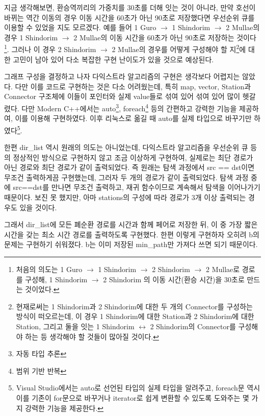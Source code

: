 \documentclass{article}
\begin{document}
지금 생각해보면, 환승역끼리의 가중치를 30초를 더해 잇는 것이 아니라, 만약 호선이 바뀌는 역간 이동의 경우 이동 시간을 60초가 아닌 90초로 저장했다면 우선순위 큐를 이용할 수 있었을 지도 모르겠다. 예를 들어 1 Guro $\rightarrow$ 1 Shindorim $\rightarrow$ 2 Mullae의 경우 1 Shindorim $\rightarrow$ 2 Mullae의 이동 시간을 60초가 아닌 90초로 저장하는 것이다\footnote{처음의 의도는 1 Guro $\rightarrow$ 1 Shindorim $\rightarrow$ 2 Shindorim $\rightarrow$ 2 Mullae로 경로를 구성해, 1 Shindorim $\rightarrow$ 2 Shindorim 의 이동 시간(환승 시간)을 30초로 만드는 것이었다.}. 그러나 이 경우 2 Shindorim $\rightarrow$ 2 Mullae의 경우를 어떻게 구성해야 할 지\footnote{현재로써는 1 Shindorim과 2 Shindorim에 대한 두 개의 Connector를 구성하는 방식이 떠오르는데, 이 경우 1 Shindorim에 대한 Station과 2 Shindorim에 대한 Station, 그리고 둘을 잇는 1 Shindorim $\leftrightarrow$ 2 Shindorim의 Connector를 구성해야 하는 등 생각해야 할 것들이 많아질 것이다.}에 대한 고민이 남아 있어 다소 복잡한 구현 난이도가 있을 것으로 예상된다.

그래프 구성을 결정하고 나자 다익스트라 알고리즘의 구현은 생각보다 어렵지는 않았다. 다만 이를 코드로 구현하는 것은 다소 어려웠는데, 특히 map, vector, Station과 Connector 구조체에 이들이 포인터와 실제 value들로 섞여 있어 섞여 있어 많이 헷갈렸다. 다만 Modern C++에서는 auto\footnote{자동 타입 추론}, foreach\footnote{범위 기반 반복} 등의 간편하고 강력한 기능을 제공하여, 이를 이용해 구현하였다. 이후 리눅스로 옮길 때 auto를 실제 타입으로 바꾸기만 하였다\footnote{Visual Studio에서는 auto로 선언된 타입의 실제 타입을 알려주고, foreach문 역시 이를 기존이 for문으로 바꾸거나 iterator로 쉽게 변환할 수 있도록 도와주는 몇 가지 강력한 기능을 제공한다.}.

한편 dir\_list 역시 원래의 의도는 아니었는데, 다익스트라 알고리즘을 우선순위 큐 등의 정상적인 방식으로 구현하지 않고 조금 이상하게 구현하여, 실제로는 최단 경로가 아닌 경로와 최단 경로가 같이 출력되었다. 즉 원래는 탐색 과정에서 src == dst이면 무조건 출력하게끔 구현했는데, 그러자 두 개의 경로가 같이 출력되었다. 탐색 과정 중에 src==dst를 만나면 무조건 출력하고, 재귀 함수이므로 계속해서 탐색을 이어나가기 때문이다. 보진 못 했지만, 아마 stations의 구성에 따라 경로가 3개 이상 출력되는 경우도 있을 것이다.

그래서 dir\_list에 모든 폐순환 경로를 시간과 함께 페어로 저장한 뒤, 이 중 가장 짧은 시간을 갖는 최소 시간 경로를 출력하도록 구현했다. 한편 이렇게 구현하자 오히려 b의 문제는 구현하기 쉬워졌다. b는 이미 저장된 min\_path만 가져다 쓰면 되기 때문이다.
\end{document}
